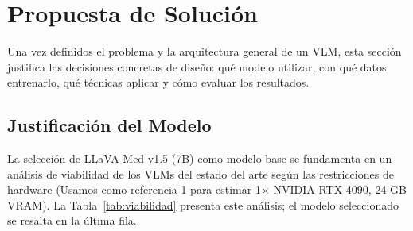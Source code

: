 \documentclass[11pt, a4paper]{article}
\begin{document}
\section{Propuesta de Solución}

Una vez definidos el problema y la arquitectura general de un VLM, esta sección justifica las decisiones concretas de diseño: qué modelo utilizar, con qué datos entrenarlo, qué técnicas aplicar y cómo evaluar los resultados.

\subsection{Justificación del Modelo}

La selección de LLaVA-Med v1.5 (7B) como modelo base se fundamenta en un análisis de viabilidad de los VLMs del estado del arte según las restricciones de hardware (Usamos como referencia 1 para estimar 1$\times$ NVIDIA RTX 4090, 24 GB VRAM). La Tabla~\ref{tab:viabilidad} presenta este análisis; el modelo seleccionado se resalta en la última fila.
\end{document}

